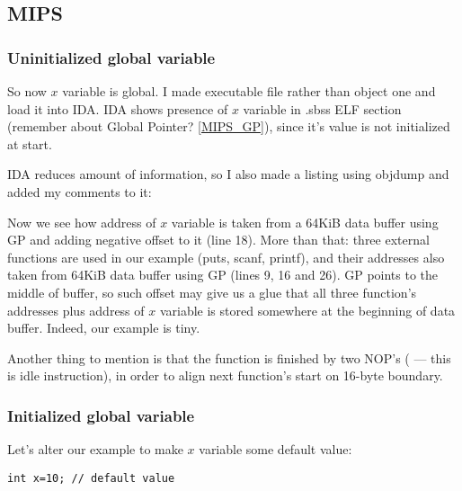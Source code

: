 \ifx\RUSSIAN\undefined

\subsection{MIPS}

\subsubsection{Uninitialized global variable}

So now $x$ variable is global.
I made executable file rather than object one and load it into IDA.
IDA shows presence of $x$ variable in .sbss ELF section (remember about Global Pointer? \ref{MIPS_GP}),
since it's value is not initialized at start.



IDA reduces amount of information, so I also made a listing using objdump and added my comments to it:



Now we see how address of $x$ variable is taken from a 64KiB data buffer using GP and adding
negative offset to it (line 18).
More than that: three external functions are used in our example (puts, scanf, printf), and their
addresses also taken from 64KiB data buffer using GP (lines 9, 16 and 26).
GP points to the middle of buffer, so such offset may give us a glue that all three function's addresses
plus address of $x$ variable is stored somewhere at the beginning of data buffer.
Indeed, our example is tiny.

Another thing to mention is that the function is finished by two NOP's ( --- this is idle
instruction), in order to align next function's start on 16-byte boundary.

\subsubsection{Initialized global variable}

Let's alter our example to make $x$ variable some default value:

\begin{lstlisting}
int x=10; // default value
\end{lstlisting}

